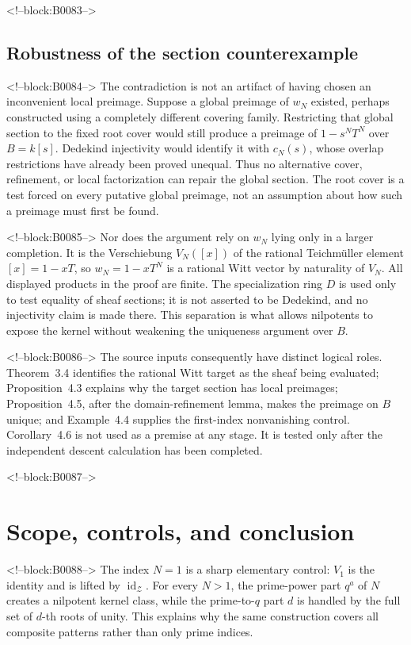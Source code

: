 \documentclass[11pt]{article}
\theoremstyle{definition}
\newcommand{\Zsh}{\mathcal Z}
\begin{document}
<!--block:B0083-->
\subsection{Robustness of the section counterexample}

<!--block:B0084-->
The contradiction is not an artifact of having chosen an inconvenient
local preimage.  Suppose a global preimage of \(w_N\) existed, perhaps
constructed using a completely different covering family.  Restricting
that global section to the fixed root cover would still produce a preimage
of \(1-s^NT^N\) over \(B=k[s]\).  Dedekind injectivity would identify it
with \(c_N(s)\), whose overlap restrictions have already been proved
unequal.  Thus no alternative cover, refinement, or local factorization can
repair the global section.  The root cover is a test forced on every
putative global preimage, not an assumption about how such a preimage must
first be found.

<!--block:B0085-->
Nor does the argument rely on \(w_N\) lying only in a larger completion.
It is the Verschiebung \(V_N([x])\) of the rational Teichm\"uller element
\([x]=1-xT\), so \(w_N=1-xT^N\) is a rational Witt vector by naturality of
\(V_N\).  All displayed products in the proof are finite.  The
specialization ring \(D\) is used only to test equality of sheaf sections;
it is not asserted to be Dedekind, and no injectivity claim is made there.
This separation is what allows nilpotents to expose the kernel without
weakening the uniqueness argument over \(B\).

<!--block:B0086-->
The source inputs consequently have distinct logical roles.
Theorem~3.4 identifies the rational Witt target as the sheaf being
evaluated; Proposition~4.3 explains why the target section has local
preimages; Proposition~4.5, after the domain-refinement lemma, makes the
preimage on \(B\) unique; and Example~4.4 supplies the first-index
nonvanishing control.  Corollary~4.6 is not used as a premise at any stage.
It is tested only after the independent descent calculation has been
completed.

<!--block:B0087-->
\section{Scope, controls, and conclusion}\label{sec:scope}

<!--block:B0088-->
The index \(N=1\) is a sharp elementary control: \(V_1\) is the identity
and is lifted by \(\operatorname{id}_{\Zsh}\).  For every \(N>1\), the
prime-power part \(q^a\) of \(N\) creates a nilpotent kernel class, while
the prime-to-\(q\) part \(d\) is handled by the full set of \(d\)-th roots
of unity.  This explains why the same construction covers all composite
patterns rather than only prime indices.
\end{document}
